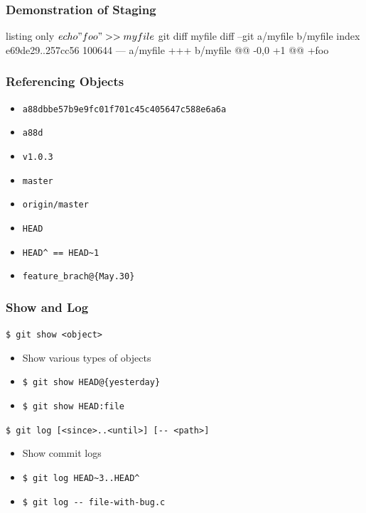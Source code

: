 \documentclass[english,compress]{beamer}
\begin{document}
\begin{frame}[fragile]
    \frametitle{Demonstration of Staging}
    \begin{tcblisting}{listing only}
$ echo "foo" >> myfile
$ git diff myfile
diff --git a/myfile b/myfile
index e69de29..257cc56 100644
--- a/myfile
+++ b/myfile
@@ -0,0 +1 @@
+foo
    \end{tcblisting}
\end{frame}

\begin{frame}[fragile]
    \frametitle{Referencing Objects}

    \begin{itemize}
        \item \verb|a88dbbe57b9e9fc01f701c45c405647c588e6a6a|
        \item \verb|a88d|
        \item \verb|v1.0.3|
        \item \verb|master|
        \item \verb|origin/master|
        \item \verb|HEAD|
        \item \verb|HEAD^ == HEAD~1|
        \item \verb|feature_brach@{May.30}|
    \end{itemize}
\end{frame}

\begin{frame}[fragile]
    \frametitle{Show and Log}

    \verb|$ git show <object>|
    \begin{itemize}
        \item Show various types of objects
        \item \verb|$ git show HEAD@{yesterday}|
        \item \verb|$ git show HEAD:file|
    \end{itemize}

    \verb|$ git log [<since>..<until>] [-- <path>]|
    \begin{itemize}
        \item Show commit logs
        \item \verb|$ git log HEAD~3..HEAD^|
        \item \verb|$ git log -- file-with-bug.c|
    \end{itemize}
\end{frame}
\end{document}
